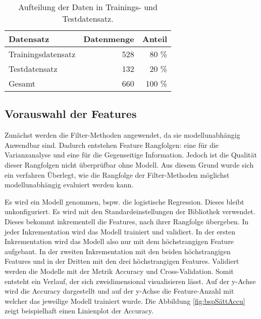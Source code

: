 \begin{table}[ht]
    \centering
    \caption{Aufteilung der Daten in Trainings- und Testdatensatz.}
    \begin{tabular}{|l|r|r|}
        \hline
        Datensatz & Datenmenge & Anteil \\
        \hline
        Trainingsdatensatz & 528 & 80 \%\\
        Testdatensatz & 132 & 20 \%\\
        \hline
        \hline
        Gesamt & 660 & 100 \%\\
        \hline
    \end{tabular}
    \label{tab:TrainTestSplit}
\end{table}

\subsection{Vorauswahl der Features}
Zunächst werden die Filter-Methoden angewendet, da sie modellunabhängig Anwendbar sind. Dadurch entstehen  Feature Rangfolgen: eine für die Varianzanalyse und eine für die Gegenseitige Information. Jedoch ist die Qualität dieser Rangfolgen nicht überprüfbar ohne Modell. Aus diesem Grund wurde sich ein verfahren Überlegt, wie die Rangfolge der Filter-Methoden möglichst modellunabhängig evaluiert werden kann. \par

Es wird ein Modell genommen, bspw. die logistische Regression. Dieses bleibt unkonfiguriert. Es wird mit den Standardeinstellungen der \gls{Bibliothek} verwendet. Dieses bekommt inkrementell die Features, nach ihrer Rangfolge übergeben. In jeder Inkrementation wird das Modell trainiert und validiert. In der ersten Inkrementation wird das Modell also nur mit dem höchstrangigen Feature aufgebaut. In der zweiten Inkrementation mit den beiden höchstrangigen Features und in der Dritten mit den drei höchstrangigen Features. Validiert werden die Modelle mit der Metrik Accuracy und Cross-Validation. Somit entsteht ein Verlauf, der sich zweidimensional visualisieren lässt. Auf der y-Achse wird die Accuracy dargestellt und auf der y-Achse die Feature-Anzahl mit welcher das jeweilige Modell trainiert wurde. Die Abbildung \ref{fig:bspSättAccu} zeigt beispielhaft einen Linienplot der Accuracy. 


